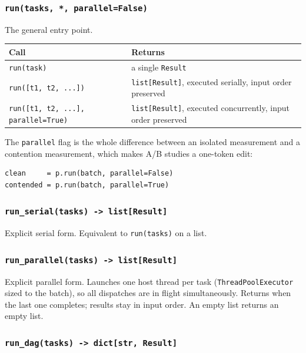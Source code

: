 \documentclass[11pt,a4paper]{article}
\newcommand{\code}[1]{\texttt{\let\_\breakableunderscore #1}}
\newcommand{\breakableunderscore}{\textunderscore\allowbreak}
\begin{document}
\subsubsection*{\texttt{run(tasks, *, parallel=False)}}

The general entry point.

\begin{longtable}{@{}p{5.2cm}p{9.7cm}@{}}
\toprule
\textbf{Call} & \textbf{Returns} \\
\midrule
\endhead
\code{run(task)} & a single \code{Result} \\
\code{run([t1, t2, ...])} & \code{list[Result]}, executed serially, input order
  preserved \\
\code{run([t1, t2, ...], parallel=True)} & \code{list[Result]}, executed
  concurrently, input order preserved \\
\bottomrule
\end{longtable}

\noindent The \code{parallel} flag is the whole difference between an isolated
measurement and a contention measurement, which makes A/B studies a one-token
edit:

\begin{lstlisting}
clean     = p.run(batch, parallel=False)
contended = p.run(batch, parallel=True)
\end{lstlisting}

\subsubsection*{\texttt{run\_serial(tasks) -> list[Result]}}

Explicit serial form. Equivalent to \code{run(tasks)} on a list.

\subsubsection*{\texttt{run\_parallel(tasks) -> list[Result]}}

Explicit parallel form. Launches one host thread per task
(\code{ThreadPoolExecutor} sized to the batch), so all dispatches are in flight
simultaneously. Returns when the last one completes; results stay in input
order. An empty list returns an empty list.

\subsubsection*{\texttt{run\_dag(tasks) -> dict[str, Result]}}
\end{document}

